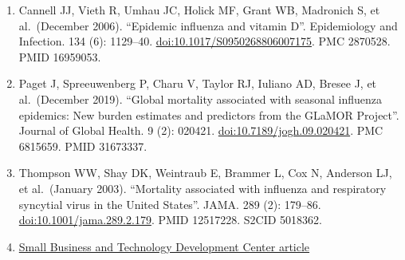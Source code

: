 \documentclass[
]{article}
\providecommand{\tightlist}{%
  \setlength{\itemsep}{0pt}\setlength{\parskip}{0pt}}
\begin{document}
\begin{enumerate}
\def\labelenumi{\arabic{enumi}.}
\tightlist
\item
  Cannell JJ, Vieth R, Umhau JC, Holick MF, Grant WB, Madronich S, et
  al.~(December 2006). ``Epidemic influenza and vitamin D''.
  Epidemiology and Infection. 134 (6): 1129--40.
  \url{doi:10.1017/S0950268806007175}. PMC 2870528. PMID 16959053.
\item
  Paget J, Spreeuwenberg P, Charu V, Taylor RJ, Iuliano AD, Bresee J, et
  al.~(December 2019). ``Global mortality associated with seasonal
  influenza epidemics: New burden estimates and predictors from the
  GLaMOR Project''. Journal of Global Health. 9 (2): 020421.
  \url{doi:10.7189/jogh.09.020421}. PMC 6815659. PMID 31673337.
\item
  Thompson WW, Shay DK, Weintraub E, Brammer L, Cox N, Anderson LJ, et
  al.~(January 2003). ``Mortality associated with influenza and
  respiratory syncytial virus in the United States''. JAMA. 289 (2):
  179--86. \url{doi:10.1001/jama.289.2.179}. PMID 12517228. S2CID
  5018362.
\item
  \href{https://sbtdc.org/resources/recovery/pandemic-flu/}{Small
  Business and Technology Development Center article}
\end{enumerate}
\end{document}
